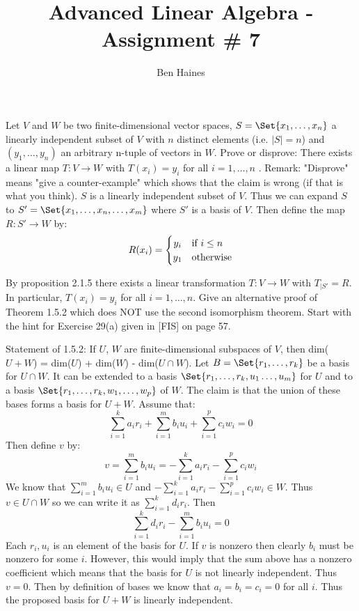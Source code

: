 \documentclass[paper=a4, fontsize=11pt]{jhwhw} %
\begin{document}
\title{Advanced Linear Algebra - Assignment \# 7}
\author{Ben Haines}

Let $V$ and $W$ be two finite-dimensional vector spaces, $S = \Set{x_1 , \ldots , x_n}$ a linearly independent
subset of $V$ with $n$ distinct elements (i.e. $|S| = n$) and $(y_1 , \ldots, y_n)$ an arbitrary n-tuple of vectors in $W$.
Prove or disprove: There exists a linear map $T : V \to W$ with $T(x_i) = y_i$  for all $i = 1, \ldots, n$ .
Remark: "Disprove" means "give a counter-example" which shows that the claim is wrong (if that is what you think).
\solution
$S$ is a linearly independent subset of $V$. Thus we can expand $S$ to $S' = \Set{x_1, \ldots, x_n, \ldots, x_m}$ where $S'$ is a basis of $V$. Then define the map $R: S'\to W$ by:
\[
    R(x_i) = \left\{\def\arraystretch{1.2}%
    \begin{array}{@{}c@{\quad}l@{}}
    y_i & \text{if $i\le n$}\\
    y_1 & \text{otherwise}\\
    \end{array}\right.
\]

By proposition 2.1.5 there exists a linear transformation $T : V\to W$ with $T_{|S'} = R$. In particular, $T(x_i) = y_i$ for all $i = 1, \ldots, n$.
Give an alternative proof of Theorem 1.5.2 which does NOT use the second isomorphism theorem.
Start with the hint for Exercise 29(a) given in [FIS] on page 57.

Statement of 1.5.2: If $U$, $W$ are finite-dimensional subspaces of $V$, then dim($U + W$) = dim($U$) + dim($W$) - dim($U\cap W$). 
\solution
Let $B = \Set{r_1, \ldots, r_k}$ be a basis for $U\cap W$. It can be extended to a basis $\Set{r_1, \ldots, r_k, u_1 \ldots, u_m}$ for $U$ and to a basis $\Set{r_1, \ldots, r_k, w_1, \ldots, w_p}$ of $W$. The claim is that the union of these bases forms a basis for $U+W$. Assume that:
$$\sum_{i=1}^{k} a_ir_i  + \sum_{i=1}^{m} b_iu_i + \sum_{i=1}^{p} c_iw_i = 0$$
Then define $v$ by:
$$v = \sum_{i=1}^{m} b_iu_i = -\sum_{i=1}^{k} a_ir_i - \sum_{i=1}^{p} c_iw_i$$
We know that $\sum_{i=1}^{m} b_iu_i \in U$ and $-\sum_{i=1}^{k} a_ir_i - \sum_{i=1}^{p} c_iw_i \in W$. Thus $v\in U\cap W$ so we can write it as $\sum_{i=1}^{k} d_ir_i$. Then
$$\sum_{i=1}^{k} d_ir_i - \sum_{i=1}^{m} b_iu_i = 0$$
Each $r_i, u_i$ is an element of the basis for $U$. If $v$ is nonzero then clearly $b_i$ must be nonzero for some $i$. However, this would imply that the sum above has a nonzero coefficient which means that the basis for $U$ is not linearly independent. Thus $v = 0$. Then by definition of bases we know that $a_i = b_i = c_i = 0$ for all $i$. Thus the proposed basis for $U+W$ is linearly independent. 
\end{document}
